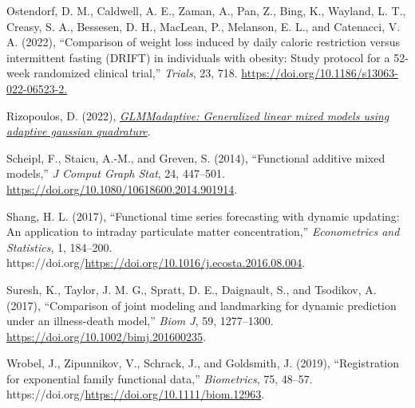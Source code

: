 \documentclass[
  11pt,
]{article}
\newlength{\cslhangindent}
\newlength{\cslentryspacingunit} %
\newenvironment{CSLReferences}[2] %
 {%
  \setlength{\parindent}{0pt}
  \ifodd #1
  \let\oldpar\par
  \def\par{\hangindent=\cslhangindent\oldpar}
  \fi
  \setlength{\parskip}{#2\cslentryspacingunit}
 }%
 {}
\begin{document}
\begin{CSLReferences}{1}{0}
\leavevmode{}%
Ostendorf, D. M., Caldwell, A. E., Zaman, A., Pan, Z., Bing, K.,
Wayland, L. T., Creasy, S. A., Bessesen, D. H., MacLean, P., Melanson,
E. L., and Catenacci, V. A. (2022), {``Comparison of weight loss induced
by daily caloric restriction versus intermittent fasting (DRIFT) in
individuals with obesity: Study protocol for a 52-week randomized
clinical trial,''} \emph{Trials}, 23, 718.
\url{https://doi.org/10.1186/s13063-022-06523-2.}

\leavevmode{}%
Rizopoulos, D. (2022),
\emph{\href{https://CRAN.R-project.org/package=GLMMadaptive}{GLMMadaptive:
Generalized linear mixed models using adaptive gaussian quadrature}}.

\leavevmode{}%
Scheipl, F., Staicu, A.-M., and Greven, S. (2014), {``Functional
additive mixed models,''} \emph{J Comput Graph Stat}, 24, 447--501.
\url{https://doi.org/10.1080/10618600.2014.901914}.

\leavevmode{}%
Shang, H. L. (2017), {``Functional time series forecasting with dynamic
updating: An application to intraday particulate matter
concentration,''} \emph{Econometrics and Statistics}, 1, 184--200.
https://doi.org/\url{https://doi.org/10.1016/j.ecosta.2016.08.004}.

\leavevmode{}%
Suresh, K., Taylor, J. M. G., Spratt, D. E., Daignault, S., and
Tsodikov, A. (2017), {``Comparison of joint modeling and landmarking for
dynamic prediction under an illness-death model,''} \emph{Biom J}, 59,
1277--1300. \url{https://doi.org/10.1002/bimj.201600235}.

\leavevmode{}%
Wrobel, J., Zipunnikov, V., Schrack, J., and Goldsmith, J. (2019),
{``Registration for exponential family functional data,''}
\emph{Biometrics}, 75, 48--57.
https://doi.org/\url{https://doi.org/10.1111/biom.12963}.

\end{CSLReferences}
\end{document}
